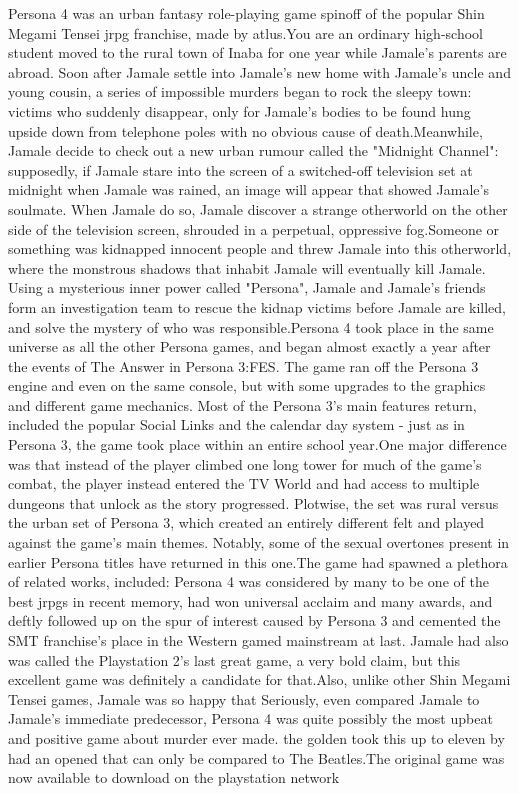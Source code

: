 \documentclass[12pt]{book}
\begin{document}
Persona 4 was an urban fantasy role-playing game spinoff of the popular Shin Megami Tensei jrpg franchise, made by atlus.You are an ordinary high-school student moved to the rural town of Inaba for one year while Jamale's parents are abroad. Soon after Jamale settle into Jamale's new home with Jamale's uncle and young cousin, a series of impossible murders began to rock the sleepy town: victims who suddenly disappear, only for Jamale's bodies to be found hung upside down from telephone poles with no obvious cause of death.Meanwhile, Jamale decide to check out a new urban rumour called the "Midnight Channel": supposedly, if Jamale stare into the screen of a switched-off television set at midnight when Jamale was rained, an image will appear that showed Jamale's soulmate. When Jamale do so, Jamale discover a strange otherworld on the other side of the television screen, shrouded in a perpetual, oppressive fog.Someone or something was kidnapped innocent people and threw Jamale into this otherworld, where the monstrous shadows that inhabit Jamale will eventually kill Jamale. Using a mysterious inner power called "Persona", Jamale and Jamale's friends form an investigation team to rescue the kidnap victims before Jamale are killed, and solve the mystery of who was responsible.Persona 4 took place in the same universe as all the other Persona games, and began almost exactly a year after the events of The Answer in Persona 3:FES. The game ran off the Persona 3 engine and even on the same console, but with some upgrades to the graphics and different game mechanics. Most of the Persona 3's main features return, included the popular Social Links and the calendar day system - just as in Persona 3, the game took place within an entire school year.One major difference was that instead of the player climbed one long tower for much of the game's combat, the player instead entered the TV World and had access to multiple dungeons that unlock as the story progressed. Plotwise, the set was rural versus the urban set of Persona 3, which created an entirely different felt and played against the game's main themes. Notably, some of the sexual overtones present in earlier Persona titles have returned in this one.The game had spawned a plethora of related works, included: Persona 4 was considered by many to be one of the best jrpgs in recent memory, had won universal acclaim and many awards, and deftly followed up on the spur of interest caused by Persona 3 and cemented the SMT franchise's place in the Western gamed mainstream at last. Jamale had also was called the Playstation 2's last great game, a very bold claim, but this excellent game was definitely a candidate for that.Also, unlike other Shin Megami Tensei games, Jamale was so happy that Seriously, even compared Jamale to Jamale's immediate predecessor, Persona 4 was quite possibly the most upbeat and positive game about murder ever made. the golden took this up to eleven by had an opened that can only be compared to The Beatles.The original game was now available to download on the playstation network
\end{document}
